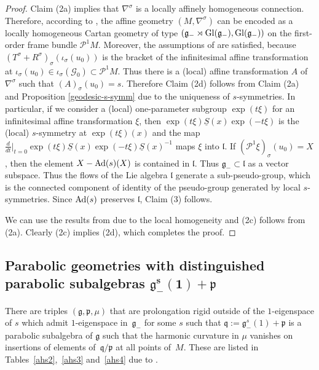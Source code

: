 \documentclass[pdftex]{sigma}
\newcommand{\si}{\sigma}
\newcommand{\un}{\underline}
\newcommand{\ba}{\mathcal{G}}
\newcommand{\fg}{\mathfrak g}
\newcommand{\fv}{\mathfrak q}
\newcommand{\fp}{\mathfrak p}
\newcommand{\fl}{\mathfrak l}
\newcommand{\Ad}{{\rm Ad}}
\numberwithin{equation}{section}
\begin{document}
\begin{proof}
Claim (2a) implies that $\nabla^\si$ is a locally af\/f\/inely homogeneous connection. Therefore, according to \cite[Section 1.5]{disertace}, the af\/f\/ine geometry $(M,\nabla^\si)$ can be encoded as a locally homogeneous Cartan geometry of type $(\fg_-\rtimes {\rm Gl}(\fg_-),{\rm Gl}(\fg_-))$ on the f\/irst-order frame bundle $\mathcal{P}^1M$. Moreover, the assumptions of \cite[Lemma~2.2]{GZ2} are satisf\/ied, because $(T^\si+R^\si)_\si(\iota_\si(u_0))$ is the bracket of the inf\/initesimal af\/f\/ine transformation at $\iota_\si(u_0)\in \iota_\si(\ba_0)\subset \mathcal{P}^1M$. Thus there is a (local) af\/f\/ine transformation $A$ of $\nabla^\si$ such that $(A)_\si(u_0)=s$. Therefore Claim (2d) follows from Claim (2a) and Proposition \ref{geodesic-s-symm} due to the uniqueness of $s$-symmetries. In particular, if we consider a (local) one-parameter subgroup $\exp(t\xi)$ for an inf\/initesimal af\/f\/ine transformation $\xi$, then $\exp(t\xi)\un S(x)\exp(-t\xi)$ is the (local) $s$-symmetry at $\exp(t\xi)(x)$ and the map $\frac{d}{dt}|_{t=0}\exp(t\xi)\un S(x)\exp(-t\xi)\un S(x)^{-1}$ maps $\xi$ into $\fl$. If $(\mathcal{P}^1\xi)_\si(u_0)=X$, then the element $X-\Ad(s)(X)$ is contained in $\fl$. Thus $\fg_-\subset \fl$ as a vector subspace. Thus the f\/lows of the Lie algebra $\fl$ generate
a sub-pseudo-group, which is the connected component of identity of the pseudo-group generated by local $s$-symmetries. Since $\Ad(s)$ preserves $\fl$, Claim (3) follows.

We can use the results from \cite[Theorem 1.3]{GZ3} due to the local homogeneity and (2c) follows from (2a). Clearly (2c) implies (2d), which completes the proof.
\end{proof}

\subsection[Parabolic geometries with distinguished parabolic subalgebras $\fg_-^s(1)+\fp$]{Parabolic geometries with distinguished parabolic subalgebras $\boldsymbol{\fg_-^s(1)+\fp}$}\label{sec5.2}

There are triples $(\fg,\fp,\mu)$ that are prolongation rigid outside of the $1$-eigenspace of $s$ which admit $1$-eigen\-space in~$\fg_-$ for some $s$ such that $\fv:=\fg_-^s(1)+\fp$ is a parabolic subalgebra of $\fg$ such that the harmonic curvature in $\mu$ vanishes on insertions of elements of~$\fv/\fp$ at all points of~$M$. These are listed in Tables~\ref{ahs2},~\ref{ahs3} and~\ref{ahs4} due to \cite[Propositions~6.2 and~A.2]{GZ3}.
\end{document}
